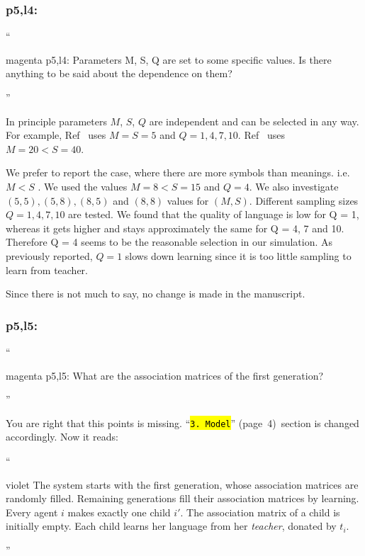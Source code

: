 \documentclass[10.5pt]{amsart}
\newcommand{\hbColorReviewer}{magenta}
\newcommand{\hbColorManuscript}{violet}
\newenvironment{hbReviewer}
	{\list{}{\leftmargin=2cm\rightmargin=1cm}\item[]``\begin{footnotesize}
	\begin{color}{\hbColorReviewer}}	
	{\end{color}\end{footnotesize}''\endlist}
\newcommand{\hbMRefP}[2]{``\texttt{{\color{\hbColorManuscript}\hl{#1}}}''  (page~#2)}
\newenvironment{hbChanged}
	{\list{}{\leftmargin=1cm\rightmargin=1.5cm}\item[]``\begin{small}
	\begin{color}{\hbColorManuscript}}	
	{\end{color}\end{small}''\endlist}
\newcommand{\hbMModel}{\hbMRefP{3. Model}{4}}
\begin{document}
\subsubsection{p5,l4:}
\begin{hbReviewer}
	p5,l4:
	Parameters M, S, Q are set to some specific values. 
	Is there anything to be said about the dependence on them?
\end{hbReviewer}

In principle parameters $M$, $S$, $Q$ are independent and
can be selected in any way.
For example, Ref~\cite{nowak1999JTB} uses $M = S = 5$ and $Q = 1, 4, 7, 10$.
Ref~\cite{nowak1999PNAS} uses $M = 20 < S = 40$.

We prefer to report the case, 
where there are more symbols than meanings.
i.e. $M < S$ .
We used the values $M = 8 < S = 15$ and $Q = 4$.
We also investigate $(5,5), (5,8), (8,5)$ and $(8,8)$ values for $(M, S)$.
Different sampling sizes $Q = 1, 4, 7, 10$ are tested.
We found that the quality of language is low for Q = 1, 
whereas it gets higher and 
stays approximately the same for Q = 4, 7 and 10. 
Therefore Q = 4 seems to be the reasonable selection in our simulation.
As previously reported, 
$Q = 1$ slows down learning since it is too little sampling to learn from teacher.

Since there is not much to say, no change is made in the manuscript.




\subsubsection{p5,l5:}
\begin{hbReviewer}
	p5,l5:
	What are the association matrices of the first generation?
\end{hbReviewer}

You are right that this points is missing. 
\hbMModel\ section is changed accordingly.
Now it reads:
\begin{hbChanged}
	The system starts with the first generation,
	whose  association matrices are randomly filled.
	Remaining generations fill their association matrices by learning.
	Every agent $i$ makes exactly one child $i'$.
	The association matrix of a child is initially empty.
	Each child learns her language from her \emph{teacher},
	donated by $t_{i}$.
\end{hbChanged}
\end{document}
